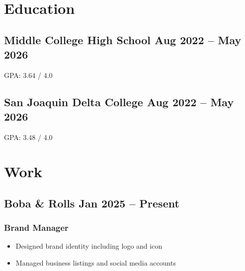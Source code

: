 \documentclass{my_cv}
\begin{document}

\section{Education}

\subsection{Middle College High School \hfill Aug 2022 -- May 2026}
GPA: 3.64 / 4.0

\subsection{San Joaquin Delta College \hfill Aug 2022 -- May 2026}
GPA: 3.48 / 4.0

\section{Work}

\subsection{Boba \& Rolls \hfill Jan 2025 -- Present}
\subsubsection{Brand \hfill Manager}
\begin{itemize}
    \item Designed brand identity including logo and icon
    \item Managed business listings and social media accounts
\end{itemize}

\end{document}

